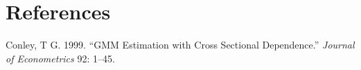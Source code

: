 \documentclass[
]{article}
\newlength{\cslhangindent}
\newenvironment{CSLReferences}[2] %
 {\begin{list}{}{%
  \setlength{\itemindent}{0pt}
  \setlength{\leftmargin}{0pt}
  \setlength{\parsep}{0pt}
  \ifodd #1
   \setlength{\leftmargin}{\cslhangindent}
   \setlength{\itemindent}{-1\cslhangindent}
  \fi
  \setlength{\itemsep}{#2\baselineskip}}}
 {\end{list}}
\begin{document}
\section*{References}\label{references}

\label{refs}
\begin{CSLReferences}{1}{0}
Conley, T G. 1999. {``GMM Estimation with Cross Sectional Dependence.''}
\emph{Journal of Econometrics} 92: 1--45.

\end{CSLReferences}
\end{document}
